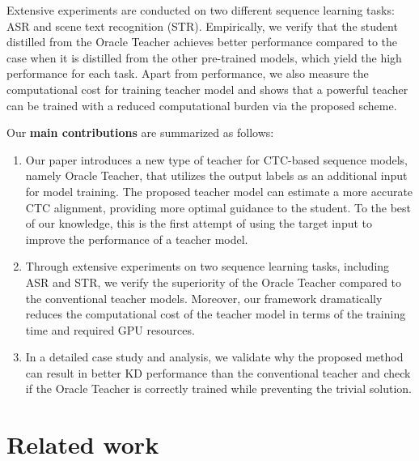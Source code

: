\documentclass[journal]{IEEEtran}
\makeatletter
\newcommand*{\rom}[1]{\expandafter\@slowromancap\romannumeral #1@}
\makeatother
\begin{document}
Extensive experiments are conducted on two different sequence learning tasks: ASR and scene text recognition (STR). 
Empirically, we verify that the student distilled from the Oracle Teacher achieves better performance compared to the case when it is distilled from the other pre-trained models, which yield the high performance for each task.
Apart from performance, we also measure the computational cost for training teacher model and shows that a powerful teacher can be trained with a reduced computational burden via the proposed scheme.

Our \textbf{main contributions} are summarized as follows:
\begin{enumerate}
    \item  Our paper introduces a new type of teacher for CTC-based sequence models, namely Oracle Teacher, that utilizes the output labels as an additional input for model training.
    The proposed teacher model can estimate a more accurate CTC alignment, providing more optimal guidance to the student.
    To the best of our knowledge, this is the first attempt of using the target input to improve the performance of a teacher model.
    \item Through extensive experiments on two sequence learning tasks, including ASR and STR, we verify the superiority of the Oracle Teacher compared to the conventional teacher models.
    Moreover, our framework dramatically reduces the computational cost of the teacher model in terms of the training time and required GPU resources.
    \item In a detailed case study and analysis, we validate why the proposed method can result in better KD performance than the conventional teacher and check if the Oracle Teacher is correctly trained while preventing the trivial solution.
    
\end{enumerate}

\section{Related work}
\label{2}
\end{document}
